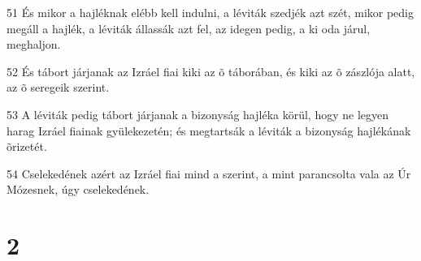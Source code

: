 \par 51 És mikor a hajléknak elébb kell indulni, a léviták szedjék azt szét, mikor pedig megáll a hajlék, a léviták állassák azt fel, az idegen pedig, a ki oda járul, meghaljon.
\par 52 És tábort járjanak az Izráel fiai kiki az õ táborában, és kiki az õ zászlója alatt, az õ seregeik szerint.
\par 53 A léviták pedig tábort járjanak a bizonyság hajléka körül, hogy ne legyen harag Izráel fiainak gyülekezetén; és megtartsák a léviták a bizonyság hajlékának õrizetét.
\par 54 Cselekedének azért az Izráel fiai mind a szerint, a mint parancsolta vala az Úr Mózesnek, úgy cselekedének.

\chapter{2}

